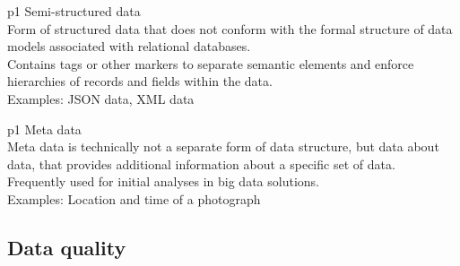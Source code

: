 \documentclass[12pt, a4paper, oneside, justified]{article}
\begin{document}
\begin{table}[!h]
\centering
\begin{tabular}{p{1\textwidth}}
    Semi-structured data \\
    \hline
    Form of structured data that does not conform with the formal structure of data models associated with relational databases. \\
    Contains tags or other markers to separate semantic elements and enforce hierarchies of records and fields within the data. \\
    Examples: JSON data, XML data
\end{tabular}
\end{table}

\begin{table}[!h]
\centering
\begin{tabular}{p{1\textwidth}}
    Meta data \\
    \hline
    Meta data is technically not a separate form of data structure, but data about data, that provides additional information about a specific set of data. \\
    Frequently used for initial analyses in big data solutions. \\
    Examples: Location and time of a photograph
\end{tabular}
\end{table}


\subsection{Data quality}

\end{document}
